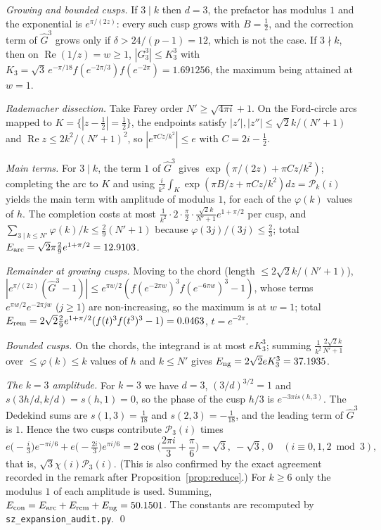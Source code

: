 \documentclass[11pt,reqno]{amsart}
\theoremstyle{plain}
\theoremstyle{definition}
\newcommand{\cP}{\mathcal P}
\renewcommand{\Re}{\operatorname{Re}}
\begin{document}
\emph{Growing and bounded cusps.} If $3\mid k$ then $d=3$, the prefactor has modulus $1$ and the exponential is $e^{\pi/(2z)}$: every such
cusp grows with $B=\frac12$, and the correction term of $\widehat G^3$ grows only if $\delta>24/(p-1)=12$, which is not the case. If
$3\nmid k$, then on $\Re(1/z)=w\ge1$,
$|G_3^3|\le K_3^3$ with $K_3=\sqrt3\,e^{-\pi/18}f(e^{-2\pi/3})f(e^{-2\pi})=1.691256$, the maximum being attained at $w=1$.

\emph{Rademacher dissection.} Take Farey order $N'\ge\sqrt{4\pi i}+1$. On the Ford-circle arcs mapped to $K=\{|z-\frac12|=\frac12\}$,
the endpoints satisfy $|z'|,|z''|\le\sqrt2k/(N'+1)$ and $\Re z\le2k^2/(N'+1)^2$, so $|e^{\pi Cz/k^2}|\le e$ with $C=2i-\frac12$.

\emph{Main terms.} For $3\mid k$, the term $1$ of $\widehat G^3$ gives $\exp(\pi/(2z)+\pi Cz/k^2)$; completing the arc to $K$ and using
$\frac i{k^2}\int_K\exp(\pi B/z+\pi Cz/k^2)dz=\cP_k(i)$ yields the main term with amplitude of modulus $1$, for each of the $\varphi(k)$
values of $h$. The completion costs at most $\frac1{k^2}\cdot2\cdot\frac\pi2\cdot\frac{\sqrt2k}{N'+1}e^{1+\pi/2}$ per cusp, and
$\sum_{3\mid k\le N'}\varphi(k)/k\le\frac29(N'+1)$ because $\varphi(3j)/(3j)\le\frac23$; total $E_{\rm arc}=\sqrt2\pi\frac29e^{1+\pi/2}=12.9103$.

\emph{Remainder at growing cusps.} Moving to the chord (length $\le2\sqrt2k/(N'+1)$), $|e^{\pi/(2z)}(\widehat G^3-1)|\le
e^{\pi w/2}(f(e^{-2\pi w})^3f(e^{-6\pi w})^3-1)$, whose terms $e^{\pi w/2}e^{-2\pi jw}$ ($j\ge1$) are non-increasing, so the maximum is at
$w=1$; total $E_{\rm rem}=2\sqrt2\frac29e^{1+\pi/2}(f(t)^3f(t^3)^3-1)=0.0463$, $t=e^{-2\pi}$.

\emph{Bounded cusps.} On the chords, the integrand is at most $eK_3^3$; summing $\frac1{k^2}\frac{2\sqrt2k}{N'+1}$ over $\le\varphi(k)\le k$
values of $h$ and $k\le N'$ gives $E_{\rm ng}=2\sqrt2eK_3^3=37.1935$.

\emph{The $k=3$ amplitude.} For $k=3$ we have $d=3$, $(3/d)^{3/2}=1$ and $s(3h/d,k/d)=s(h,1)=0$, so the phase of the cusp $h/3$ is
$e^{-3\pi is(h,3)}$. The Dedekind sums are $s(1,3)=\frac1{18}$ and $s(2,3)=-\frac1{18}$, and the leading term of $\widehat G^3$ is $1$.
Hence the two cusps contribute $\cP_3(i)$ times
\[
e\big(-\tfrac i3\big)e^{-\pi i/6}+e\big(-\tfrac{2i}3\big)e^{\pi i/6}=2\cos\Big(\frac{2\pi i}3+\frac\pi6\Big)=\sqrt3,\ -\sqrt3,\ 0
\quad(i\equiv0,1,2\bmod 3),
\]
that is, $\sqrt3\chi(i)\cP_3(i)$. (This is also confirmed by the exact agreement recorded in the remark after
Proposition~\ref{prop:reduce}.) For $k\ge6$ only the modulus $1$ of each amplitude is used.
Summing, $E_{\rm con}=E_{\rm arc}+E_{\rm rem}+E_{\rm ng}=50.1501$. The constants are recomputed by \texttt{sz\_expansion\_audit.py}.
\qed
\end{document}
